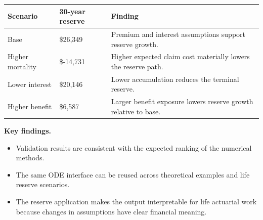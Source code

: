 \documentclass[11pt,letterpaper]{article}
\newcommand{\reportsubsection}[1]{%
  \vspace{5pt}
  {\normalsize\bfseries #1.}
}
\begin{document}
\begin{table}[H]
\centering
\small
{}
\begin{tabularx}{\textwidth}{p{1.35in} p{1.35in} Y}
\toprule
\textbf{Scenario} & \textbf{30-year reserve} & \textbf{Finding} \\
\midrule
Base & \$26,349 & Premium and interest assumptions support reserve growth. \\
Higher mortality & \$-14,731 & Higher expected claim cost materially lowers the reserve path. \\
Lower interest & \$20,146 & Lower accumulation reduces the terminal reserve. \\
Higher benefit & \$6,587 & Larger benefit exposure lowers reserve growth relative to base. \\
\bottomrule
\end{tabularx}
\end{table}

\reportsubsection{Key findings}
\begin{itemize}[leftmargin=18pt,itemsep=2pt,topsep=3pt]
  \item Validation results are consistent with the expected ranking of the numerical methods.
  \item The same ODE interface can be reused across theoretical examples and life reserve scenarios.
  \item The reserve application makes the output interpretable for life actuarial work because changes in assumptions have clear financial meaning.
\end{itemize}
\end{document}
